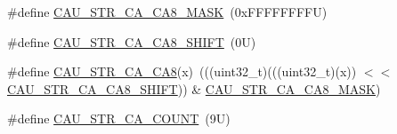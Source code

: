 \begin{DoxyCompactItemize}
\item 
\#define \mbox{\hyperlink{group___c_a_u___register___masks_ga841925012949d7e6ee56bffe7c3ccc34}{C\+A\+U\+\_\+\+S\+T\+R\+\_\+\+C\+A\+\_\+\+C\+A8\+\_\+\+M\+A\+SK}}~(0x\+F\+F\+F\+F\+F\+F\+F\+F\+U)
\item 
\#define \mbox{\hyperlink{group___c_a_u___register___masks_ga7ca88815b2d128a4164b3e14953ed7f2}{C\+A\+U\+\_\+\+S\+T\+R\+\_\+\+C\+A\+\_\+\+C\+A8\+\_\+\+S\+H\+I\+FT}}~(0\+U)
\item 
\#define \mbox{\hyperlink{group___c_a_u___register___masks_gace7494bdf03c7abbe72b1f15b8a596ce}{C\+A\+U\+\_\+\+S\+T\+R\+\_\+\+C\+A\+\_\+\+C\+A8}}(x)~(((uint32\+\_\+t)(((uint32\+\_\+t)(x)) $<$$<$ \mbox{\hyperlink{group___c_a_u___register___masks_ga7ca88815b2d128a4164b3e14953ed7f2}{C\+A\+U\+\_\+\+S\+T\+R\+\_\+\+C\+A\+\_\+\+C\+A8\+\_\+\+S\+H\+I\+FT}})) \& \mbox{\hyperlink{group___c_a_u___register___masks_ga841925012949d7e6ee56bffe7c3ccc34}{C\+A\+U\+\_\+\+S\+T\+R\+\_\+\+C\+A\+\_\+\+C\+A8\+\_\+\+M\+A\+SK}})
\item 
\#define \mbox{\hyperlink{group___c_a_u___register___masks_gadae4a07c63c1a9e219ec12d253d673e4}{C\+A\+U\+\_\+\+S\+T\+R\+\_\+\+C\+A\+\_\+\+C\+O\+U\+NT}}~(9\+U)
\end{DoxyCompactItemize}
